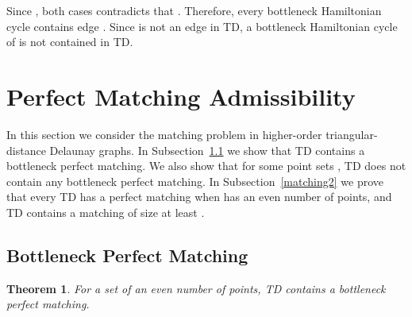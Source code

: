 \documentclass[11pt,a4paper]{article}
\newcommand{\kTD}[2]{\text{-}TD#2}
\newtheorem{theorem}{Theorem}
\begin{document}
Since , both cases contradicts that . Therefore, every bottleneck Hamiltonian cycle contains edge . Since  is not an edge in \kTD{5}{}, a bottleneck Hamiltonian cycle of  is not contained in \kTD{5}{}.  

\section{Perfect Matching Admissibility}
\label{matching}
In this section we consider the matching problem in higher-order triangular-distance Delaunay graphs. In Subsection~\ref{bottleneck-matching-section} we show that \kTD{6}{} contains a bottleneck perfect matching. We also show that for some point sets , \kTD{5}{} does not contain any bottleneck perfect matching. In Subsection~\ref{matching2} we prove that every \kTD{2}{} has a perfect matching when  has an even number of points, and \kTD{1}{} contains a matching of size at least .

\subsection{Bottleneck Perfect Matching}
\label{bottleneck-matching-section}
\begin{theorem}
\label{matching-thr}
 For a set  of an even number of points, \kTD{6}{} contains a bottleneck perfect matching.
\end{theorem}
\end{document}

